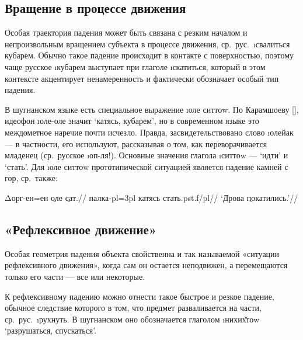 \subsection{Вращение в процессе движения} \label{down-gyrate}

Особая траектория падения может быть связана с резким началом и непроизвольным вращением субъекта в процессе движения, ср.~рус.~\i{свалиться кубарем}. Обычно такое падение происходит в контакте с поверхностью, поэтому чаще русское \i{кубарем} выступает при глаголе \i{скатиться}, который в этом контексте акцентирует ненамеренность и фактически обозначает особый тип падения.

В шугнанском языке есть специальное выражение \i{оле ситтоw}. По Карамшоеву [\cite*[237]{karamshoev1991}], идеофон \i{оле-оле} значит ‘катясь, кубарем’, но в современном языке это междометное наречие почти исчезло. Правда, засвидетельствовано слово \i{олейак} — в частности, его используют, рассказывая о том, как переворачивается младенец (ср.~русское \i{оп-ля!}). Основные значения глагола \i{ситтоw} — ‘идти’ и ‘стать’. Для \i{оле ситтоw} прототипической ситуацией является падение камней с гор, ср.~также:

\begingl
\gla Δорг-ен=ен \b{оле} \b{сат}.//
\glc палка-{\sc pl=3pl} катясь стать.{\sc pst.f/pl}//
\glft ‘Дрова \b{покатились}.’//
\endgl \xe

\subsection{«Рефлексивное движение»} \label{down-reflexive}

Особая геометрия падения объекта свойственна и так называемой «ситуации рефлексивного движения», когда сам он остается неподвижен, а перемещаются только его части — все или некоторые.

К рефлексивному падению можно отнести такое быстрое и резкое падение, обычное следствие которого в том, что предмет разваливается на части, ср.~рус.~\i{рухнуть}. В шугнанском оно обозначается глаголом \i{нихих̌тоw} ‘разрушаться, спускаться’.


